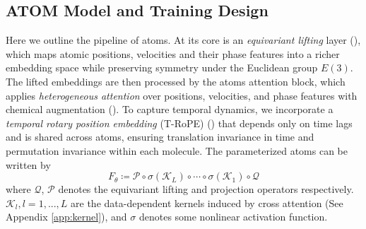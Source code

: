 



\subsection{ATOM Model and Training Design}
\label{sect:main_model}


Here we outline the pipeline of \gls{atoms}. At its core is an \textit{equivariant lifting} layer (), which maps atomic positions, velocities and their phase features into a richer embedding space while preserving symmetry under the Euclidean group \(E(3)\). The lifted embeddings are then processed by the \gls{atoms} attention block, which applies \textit{heterogeneous attention} over positions, velocities, and phase features with chemical augmentation ().  To capture temporal dynamics, we incorporate a \textit{temporal rotary position embedding} (T-RoPE) () that depends only on time lags and is shared across atoms, ensuring translation invariance in time and permutation invariance within each molecule. {The parameterized \gls{atoms} can be written by 
\begin{equation*}
    F_\theta \coloneqq \mathcal{P} \circ \sigma(\mathcal{K}_L) \circ \cdots \circ \sigma(\mathcal{K}_1) \circ \mathcal{Q}
\end{equation*}
where $\mathcal{Q}$, $\mathcal{P}$ denotes the equivariant lifting and projection operators respectively. $\mathcal{K}_l, l = 1,..., L$ are the data-dependent kernels induced by cross attention (See Appendix \ref{app:kernel}), and $\sigma$ denotes some nonlinear activation function.
}



